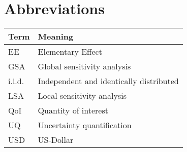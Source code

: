 

\section*{Abbreviations} %
\thispagestyle{plain} %

\phantom{This text will be invisible} 
\hspace{20cm}



\begin{table}[H]
	\centering
	\renewcommand{\arraystretch}{1.2}%
	\begin{tabular}{@{}ll@{}}
		\toprule
	Term	& Meaning \\ \midrule
		EE	& Elementary Effect \\
	GSA	& Global sensitivity analysis \\
	i.i.d.	& Independent and identically distributed  \\
	LSA	& Local sensitivity analysis \\
    QoI	& Quantity of interest \\
    UQ	& Uncertainty quantification \\
    USD	& US-Dollar  \\
 \bottomrule
	\end{tabular}
\end{table}